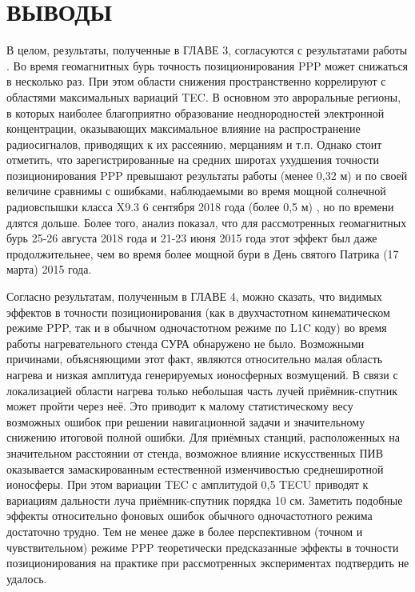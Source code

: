 \chapter*{ВЫВОДЫ}

В целом, результаты, полученные в ГЛАВЕ 3, согласуются с результатами работы \cite{Luo2018}.
Во время геомагнитных бурь точность позиционирования PPP может снижаться в несколько раз.
При этом области снижения пространственно коррелируют с областями максимальных вариаций TEC.
В основном это авроральные регионы, в которых наиболее благоприятно образование неоднородностей электронной концентрации, оказывающих максимальное влияние на распространение радиосигналов, приводящих к их рассеянию, мерцаниям и т.п.
Однако стоит отметить, что зарегистрированные на средних широтах ухудшения точности позиционирования PPP превышают результаты работы \cite{Luo2018} (менее 0,32 м) и по своей величине сравнимы с ошибками, наблюдаемыми во время мощной солнечной радиовспышки класса X9.3 6 сентября 2018 года (более 0,5 м) \cite{Yasyukevich2018}, но по времени длятся дольше.
Более того, анализ показал, что для рассмотренных геомагнитных бурь 25-26 августа 2018 года и 21-23 июня 2015 года этот эффект был даже продолжительнее, чем во время более мощной бури в День святого Патрика (17 марта) 2015 года. 

Согласно результатам, полученным в ГЛАВЕ 4, можно сказать, что видимых эффектов в точности позиционирования (как в двухчастотном кинематическом режиме PPP, так и в обычном одночастотном режиме по L1C коду) во время работы нагревательного стенда СУРА обнаружено не было. 
Возможными причинами, объясняющими этот факт, являются относительно малая область нагрева и низкая амплитуда генерируемых ионосферных возмущений.
В связи с локализацией области нагрева только небольшая часть лучей приёмник-спутник может пройти через неё.
Это приводит к малому статистическому весу возможных ошибок при решении навигационной задачи и значительному снижению итоговой полной ошибки. 
Для приёмных станций, расположенных на значительном расстоянии от стенда, возможное влияние искусственных ПИВ оказывается замаскированным естественной изменчивостью среднеширотной ионосферы.
При этом вариации TEC с амплитудой 0,5 TECU приводят к вариациям дальности луча приёмник-спутник порядка 10 см. 
Заметить подобные эффекты относительно фоновых ошибок обычного одночастотного режима достаточно трудно.
Тем не менее даже в более перспективном (точном и чувствительном) режиме PPP теоретически предсказанные эффекты в точности позиционирования на практике при рассмотренных экспериментах подтвердить не удалось.
